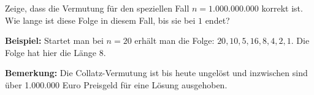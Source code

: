 \documentclass[a4paper]{article}
\begin{document}
\vspace{2pt}

Zeige, dass die Vermutung für den speziellen Fall $n = 1.000.000.000$ korrekt ist. Wie lange ist diese Folge in diesem Fall, bis sie bei $1$ endet?


\vspace{2pt}

{\footnotesize\textbf{Beispiel:}
 Startet man bei $n = 20$ erhält man die Folge: $20, 10, 5, 16, 8, 4, 2, 1$. Die Folge hat hier die Länge $8$.}  

\vspace{2pt}

{\footnotesize\textbf{Bemerkung:}
Die Collatz-Vermutung ist bis heute ungelöst und inzwischen sind über 1.000.000 Euro Preisgeld für eine Lösung ausgehoben.}  
 


  
\end{document}
